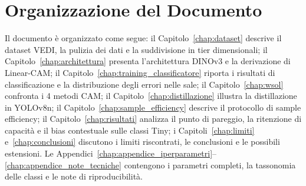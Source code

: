 \section{Organizzazione del Documento}
\label{sec:intro_struttura}
Il documento è organizzato come segue: il Capitolo~\ref{chap:dataset} descrive il dataset VEDI, la pulizia dei dati e la suddivisione in tier dimensionali; il Capitolo~\ref{chap:architettura} presenta l'architettura DINOv3 e la derivazione di Linear-CAM; il Capitolo~\ref{chap:training_classificatore} riporta i risultati di classificazione e la distribuzione degli errori nelle sale; il Capitolo~\ref{chap:wsol} confronta i 4 metodi CAM; il Capitolo~\ref{chap:distillazione} illustra la distillazione in YOLOv8n; il Capitolo~\ref{chap:sample_efficiency} descrive il protocollo di sample efficiency; il Capitolo~\ref{chap:risultati} analizza il punto di pareggio, la ritenzione di capacità e il bias contestuale sulle classi Tiny; i Capitoli~\ref{chap:limiti} e~\ref{chap:conclusioni} discutono i limiti riscontrati, le conclusioni e le possibili estensioni. Le Appendici~\ref{chap:appendice_iperparametri}--\ref{chap:appendice_note_tecniche} contengono i parametri completi, la tassonomia delle classi e le note di riproducibilità.
